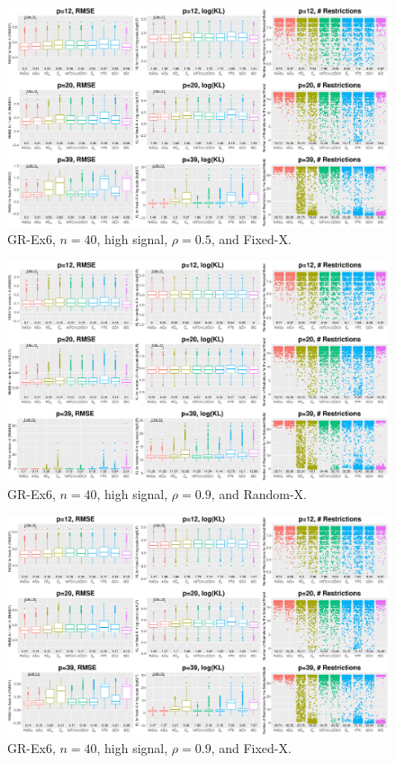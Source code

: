 \begin{figure}[!ht]
\centering
\includegraphics[width=\textwidth]{figures/supplement/fixedx_GR-Ex6_n40_hsnr_rho05.eps}
\caption{GR-Ex6, $n=40$, high signal, $\rho=0.5$, and Fixed-X.}
\end{figure}
\clearpage
\begin{figure}[!ht]
\centering
\includegraphics[width=\textwidth]{figures/supplement/randomx_GR-Ex6_n40_hsnr_rho09.eps}
\caption{GR-Ex6, $n=40$, high signal, $\rho=0.9$, and Random-X.}
\end{figure}
\begin{figure}[!ht]
\centering
\includegraphics[width=\textwidth]{figures/supplement/fixedx_GR-Ex6_n40_hsnr_rho09.eps}
\caption{GR-Ex6, $n=40$, high signal, $\rho=0.9$, and Fixed-X.}
\end{figure}
